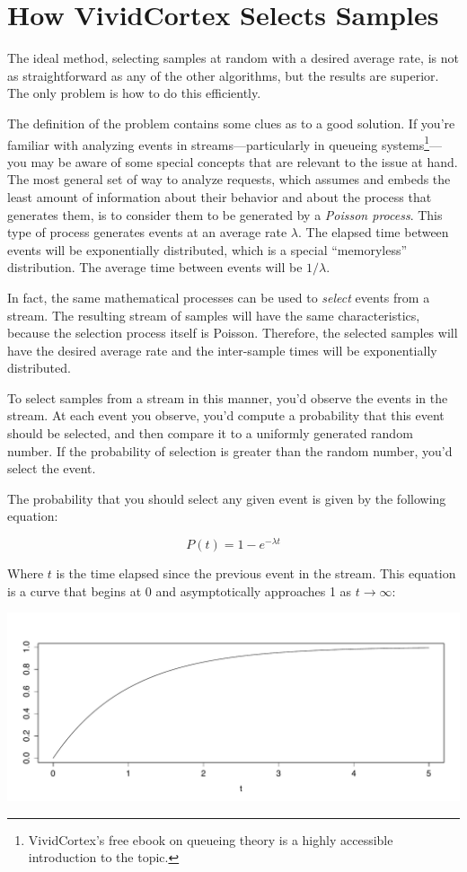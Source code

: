 \documentclass{vivid_layout}
\begin{document}
\section{How VividCortex Selects Samples}

The ideal method, selecting samples at random with a desired average rate, is
not as straightforward as any of the other algorithms, but the results are
superior.  The only problem is how to do this efficiently. 

The definition of the problem contains some clues as to a good solution. If
you're familiar with analyzing events in streams---particularly in queueing
systems\footnote{VividCortex's free ebook on queueing theory is a highly
accessible introduction to the topic.}---you may be aware of some special
concepts that are relevant to the issue at hand. The most general set of way to
analyze requests, which assumes and embeds the least amount of information about
their behavior and about the process that generates them, is to consider them to
be generated by a \emph{Poisson process}. This type of process generates events
at an average rate $\lambda$. The elapsed time between events will be
exponentially distributed, which is a special ``memoryless'' distribution. The
average time between events will be $1/\lambda$.

In fact, the same mathematical processes can be used to \emph{select} events
from a stream. The resulting stream of samples will have the same
characteristics, because the selection process itself is Poisson. Therefore, the
selected samples will have the desired average rate and the inter-sample times
will be exponentially distributed.

To select samples from a stream in this manner, you'd observe the events in the
stream. At each event you observe, you'd compute a probability that this event
should be selected, and then compare it to a uniformly generated random number.
If the probability of selection is greater than the random number, you'd select
the event.

The probability that you should select any given event is given by the following
equation:

\[
P(t) = 1-e^{-\lambda t}
\]

Where $t$ is the time elapsed since the previous event in the stream. This
equation is a curve that begins at 0 and asymptotically approaches 1 as $t
\to \infty$:

\begin{center}
\includegraphics[width=.85\linewidth]{sketch-sampling/exponential-probability}
\end{center}
\end{document}
